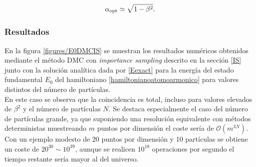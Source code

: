 \documentclass[11pt,a4paper,twoside,pdf]{article}
\numberwithin{equation}{section}
\begin{document}
\begin{equation}
\alpha_{\rm opt} \simeq \sqrt{1-\beta^2}.
\end{equation}


\newpage
\subsubsection{Resultados}


En la figura \ref{figures/E0DMCIS} se muestran los resultados numéricos obtenidos mediante el método DMC con \textit{importance sampling} descrito en la sección \ref{IS} junto con la solución analítica dada por \ref{Eexact} para la energía del estado fundamental $E_0$ del hamiltoniano \ref{hamiltonianoatomoarmonico} para valores distintos del número de partículas.\\


En este caso se observa que la coincidencia es total, incluso para valores elevados de $\beta^2$ y el número de partículas $N$. Se destaca especialmente el caso del número de partículas grande, ya que suponiendo una resolución equivalente con métodos deterministas muestreando $m$ puntos por dimensión el coste sería de $\mathcal{O}(m^{3N})$. Con un ejemplo modesto de 20 puntos por dimensión y 10 partículas se obtiene un coste de $20^{30} \sim 10^{39}$, aunque se realicen $10^{18}$ operaciones por segundo el tiempo restante sería mayor al del universo.
\end{document}
